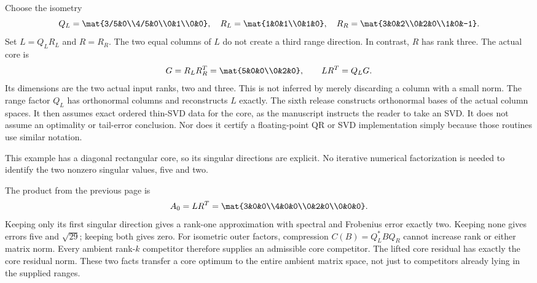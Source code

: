 Choose the isometry
\[
Q_L=\mat{3/5&0\\4/5&0\\0&1\\0&0},\quad
R_L=\mat{1&0&1\\0&1&0},\quad
R_R=\mat{3&0&2\\0&2&0\\1&0&-1}.
\]
Set $L=Q_LR_L$ and $R=R_R$. The two equal columns of $L$ do not create a third range direction. In contrast, $R$ has rank three.
The actual core is
\[
G=R_LR_R^T=\mat{5&0&0\\0&2&0},\qquad LR^T=Q_LG.
\]
Its dimensions are the two actual input ranks, two and three. This is not inferred by merely discarding a column with a small norm. The range factor $Q_L$ has orthonormal columns and reconstructs $L$ exactly.
The sixth release constructs orthonormal bases of the actual column spaces. It then assumes exact ordered thin-SVD data for the core, as the manuscript instructs the reader to take an SVD. It does not assume an optimality or tail-error conclusion. Nor does it certify a floating-point QR or SVD implementation simply because those routines use similar notation.

This example has a diagonal rectangular core, so its singular directions are explicit. No iterative numerical factorization is needed to identify the two nonzero singular values, five and two.

The product from the previous page is
\[
A_0=LR^T=\mat{3&0&0\\4&0&0\\0&2&0\\0&0&0}.
\]
Keeping only its first singular direction gives a rank-one approximation with spectral and Frobenius error exactly two. Keeping none gives errors five and $\sqrt{29}$; keeping both gives zero.
For isometric outer factors, compression $C(B)=Q_L^*BQ_R$ cannot increase rank or either matrix norm. Every ambient rank-$k$ competitor therefore supplies an admissible core competitor. The lifted core residual has exactly the core residual norm. These two facts transfer a core optimum to the entire ambient matrix space, not just to competitors already lying in the supplied ranges.


